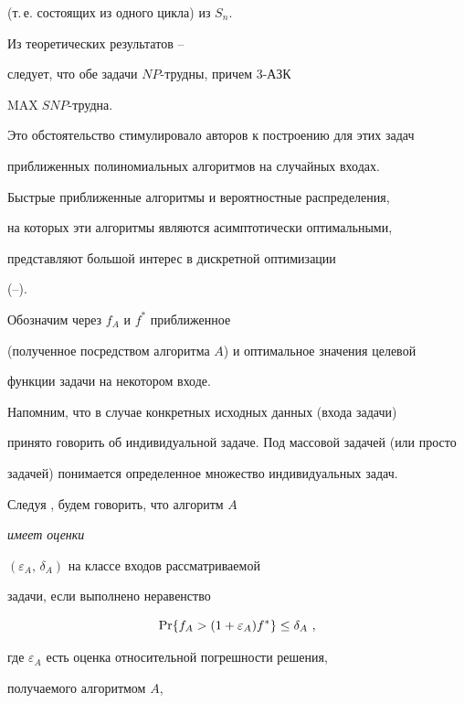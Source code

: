 (т.\,е. состоящих из одного цикла) из $ S_n$. 





Из теоретических результатов \cite{GJ79}--\cite{SG76}


следует, что обе задачи $NP$-трудны, причем 3-АЗК\;


$\mathrm{MAX}\;SNP$-трудна.


Это обстоятельство стимулировало авторов к построению для этих задач 


приближенных полиномиальных алгоритмов на случайных входах.





Быстрые приближенные алгоритмы и вероятностные распределения,


на которых эти алгоритмы являются асимптотически оптимальными,


представляют большой интерес в дискретной оптимизации


(\cite{G88}--\cite{TSP}). 





Обозначим через $f_{ A}$ и $ f^{*} $ приближенное


(полученное посредством алгоритма $ A $) и оптимальное значения целевой


функции задачи на некотором входе. 


Напомним, что в случае конкретных исходных данных (входа задачи) 


принято говорить об индивидуальной задаче. Под массовой задачей (или просто 


задачей) понимается определенное множество индивидуальных задач.


 


Следуя \cite{GGP75}, будем говорить, что алгоритм $A$


{\em имеет оценки} 


$(\varepsilon_{ A},\, \delta_{ A})$ на классе входов рассматриваемой


задачи, если выполнено неравенство


$$


\PR \{ f_{ A} >  ( 1+\varepsilon_{ A} ) f^{*} \} \leq \delta_{ A}\ ,


$$


где $\varepsilon_{A}$ есть оценка относительной погрешности решения, 


получаемого алгоритмом $A$,


